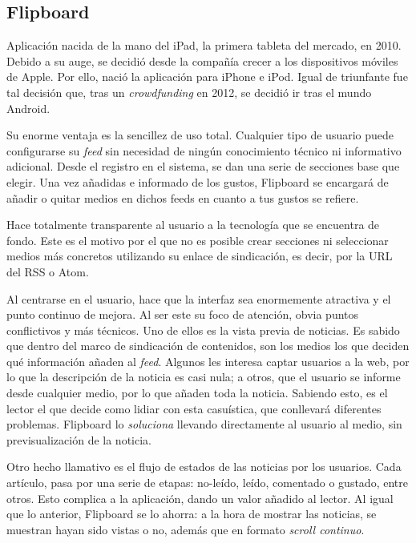 \subsection{Flipboard}

Aplicación nacida de la mano del iPad, la primera tableta del mercado, en 2010. Debido a su auge, se decidió desde la compañía crecer a los dispositivos móviles de Apple. Por ello, nació la aplicación para iPhone e iPod. Igual de triunfante fue tal decisión que, tras un \textit{crowdfunding} en 2012, se decidió ir tras el mundo Android.


Su enorme ventaja es la sencillez de uso total. Cualquier tipo de usuario puede configurarse su \textit{feed} sin necesidad de ningún conocimiento técnico ni informativo adicional. Desde el registro en el sistema, se dan una serie de secciones base que elegir. Una vez añadidas e informado de los gustos, Flipboard se encargará de añadir o quitar medios en dichos feeds en cuanto a tus gustos se refiere.

Hace totalmente transparente al usuario a la tecnología que se encuentra de fondo. Este es el motivo por el que no es posible crear secciones ni seleccionar medios más concretos utilizando su enlace de sindicación, es decir, por la URL del RSS o Atom.

Al centrarse en el usuario, hace que la interfaz sea enormemente atractiva y el punto continuo de mejora. Al ser este su foco de atención, obvia puntos conflictivos y más técnicos. Uno de ellos es la vista previa de noticias. Es sabido que dentro del marco de sindicación de contenidos, son los medios los que deciden qué información añaden al \textit{feed}. Algunos les interesa captar usuarios a la web, por lo que la descripción de la noticia es casi nula; a otros, que el usuario se informe desde cualquier medio, por lo que añaden toda la noticia. Sabiendo esto, es el lector el que decide como lidiar con esta casuística, que conllevará diferentes problemas. Flipboard lo \textit{soluciona} llevando directamente al usuario al medio, sin previsualización de la noticia.

Otro hecho llamativo es el flujo de estados de las noticias por los usuarios. Cada artículo, pasa por una serie de etapas: no-leído, leído, comentado o gustado, entre otros. Esto complica a la aplicación, dando un valor añadido al lector. Al igual que lo anterior, Flipboard se lo ahorra: a la hora de mostrar las noticias, se muestran hayan sido vistas o no, además que en formato \textit{scroll continuo}.

